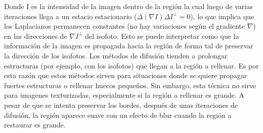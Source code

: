 \documentclass[assd_tpf_lineasinvest.tex]{subfiles}
\begin{document}
Donde I es la intensidad de la imagen dentro de la región la cual luego de varias iteraciones llega a un estacio estacionario ($\Delta(\nabla I)\Delta I^{\perp} = 0$), lo que implica que los Laplacianos permanecen constantes  (no hay variaciones según el gradiente $\nabla$) en las direcciones de $\nabla I^{\perp} $ del isofoto. Esto se puede interpretar como que la información de la imagen es propagada hacia la región de forma tal de preservar la dirección de los isofotos.
Los métodos de difusión tienden a prolongar estructuras (por ejemplo, con los isofotos) que llegan a la región a rellenar.  Es por esta razón que estos métodos sirven para situaciones donde se quiere propagar fuertes estructuras o rellenar huecos pequeños. Sin embargo, esta técnica no sirve para imagenes texturizadas, especialmente si la región a rellenar es grande. A pesar de que se intenta preservar los bordes, después de unas iteraciones de difusión, la región aparece suave con un efecto de blur cuando la región a restaurar es grande. 
\end{document}
